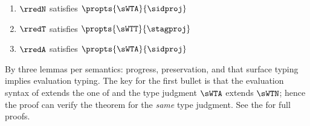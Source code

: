 \begin{theorem}\label{thm:type-soundness}
 \leavevmode
  \begin{enumerate}
    \itemsep0.5ex
    \item $\rredN$ satisfies $\propts{\sWTA}{\sidproj}$
    \item $\rredT$ satisfies $\propts{\sWTT}{\stagproj}$
    \item $\rredA$ satisfies $\propts{\sWTA}{\sidproj}$
  \end{enumerate}
\end{theorem}
\begin{proofsketch}
  By three lemmas per semantics: progress, preservation, and that surface
  typing implies evaluation typing.  The key for the first bullet is that
  the evaluation syntax of \Aname{} extends the one of \Nname{} and the
  type judgment $\sWTA$ extends $\sWTN$; hence the proof can verify the
  theorem for the {\em same\/} type judgment.  See the
  \techreport{} for full proofs.
\end{proofsketch}


